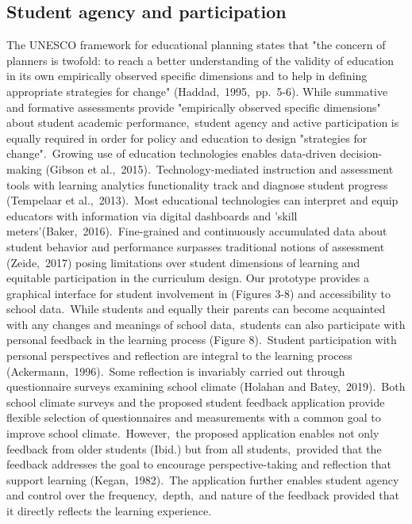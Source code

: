 \documentclass{article}
\begin{document}
\subsection{Student agency and participation}
The UNESCO framework for educational planning states that "the concern of planners is twofold: to reach a better understanding of the validity of education in its own empirically observed specific dimensions and to help in defining appropriate strategies for change" (Haddad,\ 1995,\ pp.\ 5-6).
\bigbreak
While summative and formative assessments provide "empirically observed specific dimensions" about student academic performance,\ student agency and active participation is equally required in order for policy and education to design "strategies for change".\ Growing use of education technologies enables data-driven decision-making (Gibson et al.,\ 2015).\ Technology-mediated instruction and assessment tools with learning analytics functionality track and diagnose student progress (Tempelaar et al.,\ 2013).\ Most educational technologies can interpret and equip educators with information via digital dashboards and 'skill meters'(Baker,\ 2016).\ Fine-grained and continuously accumulated data about student behavior and performance surpasses traditional notions of assessment (Zeide,\ 2017) posing limitations over student dimensions of learning and equitable participation in the curriculum design.
\bigbreak
Our prototype provides a graphical interface for student involvement in (Figures 3-8) and accessibility to school data.\ While students and equally their parents can become acquainted with any changes and meanings of school data,\ students can also participate with personal feedback in the learning process (Figure 8).\ Student participation with personal perspectives and reflection are integral to the learning process (Ackermann,\ 1996).\ Some reflection is invariably carried out through questionnaire surveys examining school climate (Holahan and Batey,\ 2019).\ Both school climate surveys and the proposed student feedback application provide flexible selection of questionnaires and measurements with a common goal to improve school climate.\ However,\ the proposed application enables not only feedback from older students (Ibid.) but from all students,\ provided that the feedback addresses the goal to encourage perspective-taking and reflection that support learning (Kegan,\ 1982).\ The application further enables student agency and control over the frequency,\ depth,\ and nature of the feedback provided that it directly reflects the learning experience.
\end{document}
